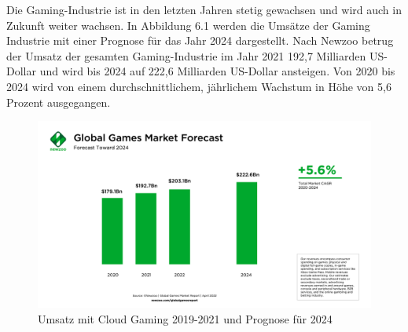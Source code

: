 \documentclass[12pt,toc=bib,toc=listof]{scrreprt}
\begin{document}
Die Gaming-Industrie ist in den letzten Jahren stetig gewachsen und wird auch in Zukunft weiter
wachsen. In Abbildung 6.1 werden die Umsätze der Gaming Industrie mit einer Prognose für das Jahr 2024 dargestellt.
Nach Newzoo betrug der Umsatz der gesamten Gaming-Industrie im Jahr 2021 192,7 Milliarden
US-Dollar und wird bis 2024 auf 222,6 Milliarden US-Dollar ansteigen. Von 2020 bis 2024 wird 
von einem durchschnittlichem, jährlichem Wachstum in Höhe von 5,6 Prozent ausgegangen.
\\%
\begin{figure}[h]
 \centering
  \includegraphics[scale=0.12]{Abbildungen/Newzoo_Global_Games_Revenue_Forecast-2.png} 
  \caption[Newzoo 2022]{Umsatz mit Cloud Gaming 2019-2021 und Prognose für 2024}
\end{figure}
\\%
\end{document}
